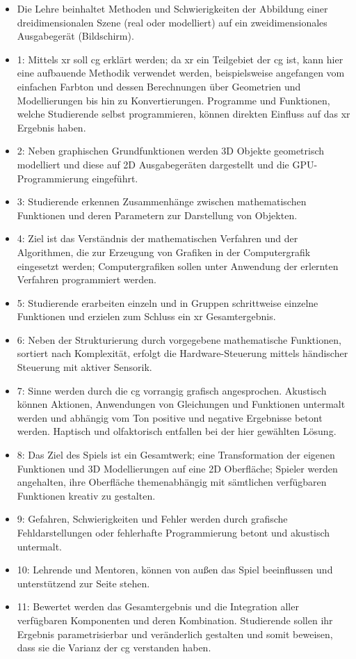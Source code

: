 \documentclass[conference]{IEEEtran}
\begin{document}
\begin{itemize}
\item Die Lehre beinhaltet Methoden und Schwierigkeiten der Abbildung einer dreidimensionalen Szene (real oder modelliert) auf ein zweidimensionales Ausgabegerät (Bildschirm)\cite{scholl}.
\item 1: Mittels \gls{xr} soll \gls{cg} erklärt werden; da \gls{xr} ein Teilgebiet der \gls{cg} ist, kann hier eine aufbauende Methodik verwendet werden,
beispielsweise angefangen vom einfachen Farbton und dessen Berechnungen über Geometrien und Modellierungen bis hin zu Konvertierungen.
Programme und Funktionen, welche Studierende selbst programmieren, können direkten Einfluss auf das \gls{xr} Ergebnis haben.
\item 2: Neben graphischen Grundfunktionen werden 3D Objekte geometrisch modelliert und diese auf 2D Ausgabegeräten dargestellt und die GPU-Programmierung eingeführt.
\item 3: Studierende erkennen Zusammenhänge zwischen mathematischen Funktionen und deren Parametern zur Darstellung von Objekten.
\item 4: Ziel ist das Verständnis der mathematischen Verfahren und der Algorithmen, die zur Erzeugung von Grafiken in der Computergrafik eingesetzt werden;
Computergrafiken sollen unter Anwendung der erlernten Verfahren programmiert werden.
\item 5: Studierende erarbeiten einzeln und in Gruppen schrittweise einzelne Funktionen und erzielen zum Schluss ein \gls{xr} Gesamtergebnis.
\item 6: Neben der Strukturierung durch vorgegebene mathematische Funktionen, sortiert nach Komplexität,
erfolgt die Hardware-Steuerung mittels händischer Steuerung mit aktiver Sensorik.
\item 7: Sinne werden durch die \gls{cg} vorrangig grafisch angesprochen.
Akustisch können Aktionen, Anwendungen von Gleichungen und Funktionen untermalt werden und abhängig vom Ton positive und negative Ergebnisse betont werden.
Haptisch und olfaktorisch entfallen bei der hier gewählten Lösung.
\item 8: Das Ziel des Spiels ist ein Gesamtwerk; eine Transformation der eigenen Funktionen und 3D Modellierungen auf eine 2D Oberfläche;
Spieler werden angehalten, ihre Oberfläche themenabhängig mit sämtlichen verfügbaren Funktionen kreativ zu gestalten.
\item 9: Gefahren, Schwierigkeiten und Fehler werden durch grafische Fehldarstellungen oder fehlerhafte Programmierung betont
und akustisch untermalt.
\item 10: Lehrende und Mentoren, können von außen das Spiel beeinflussen und unterstützend zur Seite stehen.
\item 11: Bewertet werden das Gesamtergebnis und die Integration aller verfügbaren Komponenten und deren Kombination.
Studierende sollen ihr Ergebnis parametrisierbar und veränderlich gestalten und somit beweisen, dass sie die Varianz der \gls{cg} verstanden haben.
\end{itemize}
\end{document}
